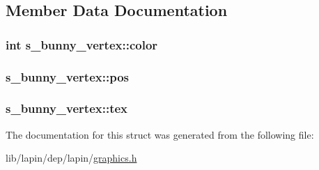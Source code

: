 \subsection{Member Data Documentation}
\hypertarget{structs__bunny__vertex_aefec2984840ed9aa7467cd08213e041d}{
\subsubsection[{color}]{ {\bf int} s\-\_\-bunny\-\_\-vertex\-::color}}\label{structs__bunny__vertex_aefec2984840ed9aa7467cd08213e041d}
\hypertarget{structs__bunny__vertex_aa0cd5bd0ea037e46c986cf03ce5d481d}{
\subsubsection[{pos}]{ s\-\_\-bunny\-\_\-vertex\-::pos}}\label{structs__bunny__vertex_aa0cd5bd0ea037e46c986cf03ce5d481d}
\hypertarget{structs__bunny__vertex_acbd15cb3c2721d5bae73f5e8f23ec28e}{
\subsubsection[{tex}]{ s\-\_\-bunny\-\_\-vertex\-::tex}}\label{structs__bunny__vertex_acbd15cb3c2721d5bae73f5e8f23ec28e}


The documentation for this struct was generated from the following file\-:\begin{DoxyCompactItemize}
\item 
lib/lapin/dep/lapin/\hyperlink{graphics_8h}{graphics.\-h}\end{DoxyCompactItemize}
